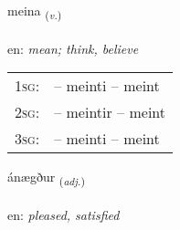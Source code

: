 \documentclass[frontgrid, backgrid]{flacards}\usepackage[]{graphicx}\usepackage[]{color}
\begin{document}
\renewcommand{\flhead}{\vskip5pt \fboxsep=0pt {\small\bfseries\footnotesize Sagnorð | Verb}}
\renewcommand{\fcfoot}{\vskip5pt \fboxsep=0pt \hspace{2pt}{\small\bfseries\footnotesize 2K}}

\renewcommand{\blhead}{\vskip5pt {\small\bfseries\footnotesize Sagnorð | Verb }}
\renewcommand{\bcfoot}{\vskip5pt \hspace{2pt}{\small\bfseries\footnotesize 2K}}


{meina \small{\textsubscript{(\textit{v.})}} \\[1ex] %
\textphonetic{[meiːna]} \\
en: \emph{mean; think, believe} \\  [2ex]
\renewcommand*{\arraystretch}{0.8}
\begin{tabular}{p{1cm}l}
\textsc{1sg}: &  -- meinti -- meint \\ 
\textsc{2sg}: &  -- meintir -- meint \\ 
\textsc{3sg}: &  -- meinti -- meint \\ 
\end{tabular}
}

\renewcommand{\flhead}{\vskip5pt \fboxsep=0pt {\small\bfseries\footnotesize Lýsingarorð | Adjective}}
\renewcommand{\fcfoot}{\vskip5pt \fboxsep=0pt \hspace{2pt}{\small\bfseries\footnotesize 2K}}

\renewcommand{\blhead}{\vskip5pt {\small\bfseries\footnotesize Lýsingarorð | Adjective }}
\renewcommand{\bcfoot}{\vskip5pt \hspace{2pt}{\small\bfseries\footnotesize 2K}}


{ánægður \small{\textsubscript{(\textit{adj.})}} \\[1ex] %
\textphonetic{[auːnaiɣðʏr]} \\
en: \emph{pleased, satisfied} \\  [2ex]
\renewcommand*{\arraystretch}{0.8}
}
\end{document}
